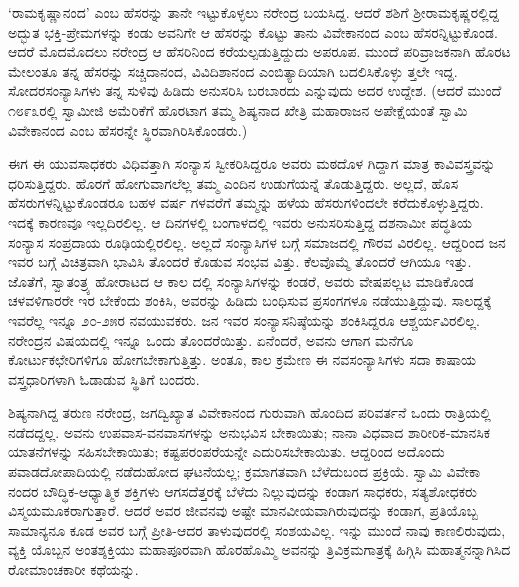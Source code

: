 ‘ರಾಮಕೃಷ್ಣಾನಂದ’ ಎಂಬ ಹೆಸರನ್ನು ತಾನೇ ಇಟ್ಟುಕೊಳ್ಳಲು ನರೇಂದ್ರ ಬಯಸಿದ್ದ. ಆದರೆ ಶಶಿಗೆ ಶ್ರೀರಾಮಕೃಷ್ಣರಲ್ಲಿದ್ದ ಅದ್ಭುತ ಭಕ್ತಿ-ಪ್ರೇಮಗಳನ್ನು ಕಂಡು ಅವನಿಗೇ ಆ ಹೆಸರನ್ನು ಕೊಟ್ಟು ತಾನು ವಿವೇಕಾನಂದ ಎಂಬ ಹೆಸರನ್ನಿಟ್ಟುಕೊಂಡ. ಆದರೆ ಮೊದಮೊದಲು ನರೇಂದ್ರ ಆ ಹೆಸರಿನಿಂದ ಕರೆಯಲ್ಪಡುತ್ತಿದ್ದುದು ಅಪರೂಪ. ಮುಂದೆ ಪರಿವ್ರಾಜಕನಾಗಿ ಹೊರಟ ಮೇಲಂತೂ ತನ್ನ ಹೆಸರನ್ನು ಸಚ್ಚಿದಾನಂದ, ವಿವಿದಿಶಾನಂದ ಎಂಬಿತ್ಯಾದಿಯಾಗಿ ಬದಲಿಸಿಕೊಳ್ಳು ತ್ತಲೇ ಇದ್ದ. ಸೋದರಸಂನ್ಯಾಸಿಗಳು ತನ್ನ ಸುಳಿವು ಹಿಡಿದು ಅನುಸರಿಸಿ ಬರಬಾರದು ಎನ್ನುವುದು ಅದರ ಉದ್ದೇಶ. (ಆದರೆ ಮುಂದೆ ೧೮೯೩ರಲ್ಲಿ ಸ್ವಾಮೀಜಿ ಅಮೆರಿಕೆಗೆ ಹೊರಟಾಗ ತಮ್ಮ ಶಿಷ್ಯನಾದ ಖೇತ್ರಿ ಮಹಾರಾಜನ ಅಪೇಕ್ಷೆಯಂತೆ ಸ್ವಾಮಿ ವಿವೇಕಾನಂದ ಎಂಬ ಹೆಸರನ್ನೇ ಸ್ಥಿರವಾಗಿರಿಸಿಕೊಂಡರು.)

ಈಗ ಈ ಯುವಸಾಧಕರು ವಿಧಿವತ್ತಾಗಿ ಸಂನ್ಯಾಸ ಸ್ವೀಕರಿಸಿದ್ದರೂ ಅವರು ಮಠದೊಳ ಗಿದ್ದಾಗ ಮಾತ್ರ ಕಾವಿವಸ್ತ್ರವನ್ನು ಧರಿಸುತ್ತಿದ್ದರು. ಹೊರಗೆ ಹೋಗುವಾಗಲೆಲ್ಲ ತಮ್ಮ ಎಂದಿನ ಉಡುಗೆಯನ್ನೆ ತೊಡುತ್ತಿದ್ದರು. ಅಲ್ಲದೆ, ಹೊಸ ಹೆಸರುಗಳನ್ನಿಟ್ಟುಕೊಂಡರೂ ಬಹಳ ವರ್ಷ ಗಳವರೆಗೆ ತಮ್ಮನ್ನು ಹಳೆಯ ಹೆಸರುಗಳಿಂದಲೇ ಕರೆದುಕೊಳ್ಳುತ್ತಿದ್ದರು. ಇದಕ್ಕೆ ಕಾರಣವೂ ಇಲ್ಲದಿರಲಿಲ್ಲ. ಆ ದಿನಗಳಲ್ಲಿ ಬಂಗಾಳದಲ್ಲಿ ಇವರು ಅನುಸರಿಸುತ್ತಿದ್ದ ದಶನಾಮೀ ಪದ್ಧತಿಯ ಸಂನ್ಯಾಸ ಸಂಪ್ರದಾಯ ರೂಢಿಯಲ್ಲಿರಲಿಲ್ಲ. ಅಲ್ಲದೆ ಸಂನ್ಯಾಸಿಗಳ ಬಗ್ಗೆ ಸಮಾಜದಲ್ಲಿ ಗೌರವ ವಿರಲಿಲ್ಲ. ಆದ್ದರಿಂದ ಜನ ಇವರ ಬಗ್ಗೆ ವಿಚಿತ್ರವಾಗಿ ಭಾವಿಸಿ ತೊಂದರೆ ಕೊಡುವ ಸಂಭವ ವಿತ್ತು. ಕೆಲವೊಮ್ಮೆ ತೊಂದರೆ ಆಗಿಯೂ ಇತ್ತು. ಜೊತೆಗೆ, ಸ್ವಾತಂತ್ರ್ಯ ಹೋರಾಟದ ಆ ಕಾಲ ದಲ್ಲಿ ಸಂನ್ಯಾಸಿಗಳನ್ನು ಕಂಡರೆ, ಅವರು ವೇಷಪಲ್ಲಟ ಮಾಡಿಕೊಂಡ ಚಳವಳಿಗಾರರೇ ಇರ ಬೇಕೆಂದು ಶಂಕಿಸಿ, ಅವರನ್ನು ಹಿಡಿದು ಬಂಧಿಸುವ ಪ್ರಸಂಗಗಳೂ ನಡೆಯುತ್ತಿದ್ದುವು. ಸಾಲದ್ದಕ್ಕೆ ಇವರೆಲ್ಲ ಇನ್ನೂ ೨೦-೨೫ರ ನವಯುವಕರು. ಜನ ಇವರ ಸಂನ್ಯಾಸನಿಷ್ಠೆಯನ್ನು ಶಂಕಿಸಿದ್ದರೂ ಆಶ್ಚರ್ಯವಿರಲಿಲ್ಲ. ನರೇಂದ್ರನ ವಿಷಯದಲ್ಲಿ ಇನ್ನೂ ಒಂದು ತೊಂದರೆಯಿತ್ತು. ಏನೆಂದರೆ, ಅವನು ಆಗಾಗ ಮನೆಗೂ ಕೋರ್ಟುಕಛೇರಿಗಳಿಗೂ ಹೋಗಬೇಕಾಗುತ್ತಿತ್ತು. ಅಂತೂ, ಕಾಲ ಕ್ರಮೇಣ ಈ ನವಸಂನ್ಯಾಸಿಗಳು ಸದಾ ಕಾಷಾಯ ವಸ್ತ್ರಧಾರಿಗಳಾಗಿ ಓಡಾಡುವ ಸ್ಥಿತಿಗೆ ಬಂದರು.

ಶಿಷ್ಯನಾಗಿದ್ದ ತರುಣ ನರೇಂದ್ರ, ಜಗದ್ವಿಖ್ಯಾತ ವಿವೇಕಾನಂದ ಗುರುವಾಗಿ ಹೊಂದಿದ ಪರಿವರ್ತನೆ ಒಂದು ರಾತ್ರಿಯಲ್ಲಿ ನಡೆದದ್ದಲ್ಲ. ಅವನು ಉಪವಾಸ-ವನವಾಸಗಳನ್ನು ಅನುಭವಿಸ ಬೇಕಾಯಿತು; ನಾನಾ ವಿಧವಾದ ಶಾರೀರಿಕ-ಮಾನಸಿಕ ಯಾತನೆಗಳನ್ನು ಸಹಿಸಬೇಕಾಯಿತು; ಕಷ್ಟಪರಂಪರೆಯನ್ನೇ ಎದುರಿಸಬೇಕಾಯಿತು. ಆದ್ದರಿಂದ ಅದೊಂದು ಪವಾಡದೋಪಾದಿಯಲ್ಲಿ ನಡೆದುಹೋದ ಘಟನೆಯಲ್ಲ; ಕ್ರಮಾಗತವಾಗಿ ಬೆಳೆದುಬಂದ ಪ್ರಕ್ರಿಯೆ. ಸ್ವಾಮಿ ವಿವೇಕಾ ನಂದರ ಬೌದ್ಧಿಕ-ಆಧ್ಯಾತ್ಮಿಕ ಶಕ್ತಿಗಳು ಆಗಸದೆತ್ತರಕ್ಕೆ ಬೆಳೆದು ನಿಲ್ಲುವುದನ್ನು ಕಂಡಾಗ ಸಾಧಕರು, ಸತ್ಯಶೋಧಕರು ವಿಸ್ಮಯಮೂಕರಾಗುತ್ತಾರೆ. ಆದರೆ ಅವರ ಜೀವನವು ಅಷ್ಟೇ ಮಾನವೀಯವಾಗಿರುವುದನ್ನು ಕಂಡಾಗ, ಪ್ರತಿಯೊಬ್ಬ ಸಾಮಾನ್ಯನೂ ಕೂಡ ಅವರ ಬಗ್ಗೆ ಪ್ರೀತಿ-ಆದರ ತಾಳುವುದರಲ್ಲಿ ಸಂಶಯವಿಲ್ಲ. ಇನ್ನು ಮುಂದೆ ನಾವು ಕಾಣಲಿರುವುದು, ವ್ಯಕ್ತಿ ಯೊಬ್ಬನ ಅಂತಶ್ಶಕ್ತಿಯು ಮಹಾಪೂರವಾಗಿ ಹೊರಹೊಮ್ಮಿ ಅವನನ್ನು ತ್ರಿವಿಕ್ರಮಗಾತ್ರಕ್ಕೆ ಹಿಗ್ಗಿಸಿ ಮಹಾತ್ಮನನ್ನಾಗಿಸಿದ ರೋಮಾಂಚಕಾರೀ ಕಥೆಯನ್ನು.

